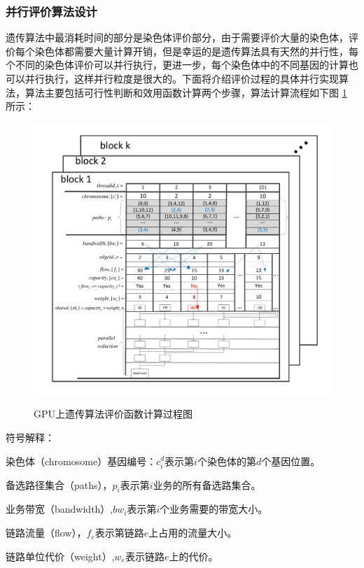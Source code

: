\subsubsection{并行评价算法设计}
遗传算法中最消耗时间的部分是染色体评价部分，由于需要评价大量的染色体，评价每个染色体都需要大量计算开销，但是幸运的是遗传算法具有天然的并行性，每个不同的染色体评价可以并行执行，更进一步，每个染色体中的不同基因的计算也可以并行执行，这样并行粒度是很大的。下面将介绍评价过程的具体并行实现算法，算法主要包括可行性判断和效用函数计算两个步骤，算法计算流程如下图 \ref{fitness} 所示：
\begin{figure}
  \begin{center}
    {\includegraphics[width=1 \textwidth]{figures/GPUfitness.pdf}}
    \end{center}
  \caption{{\footnotesize{GPU上遗传算法评价函数计算过程图}}}
  \label{fitness}
\end{figure}
符号解释：

染色体（chromosome）基因编号：$c^d_i$表示第$i$个染色体的第$d$个基因位置。

备选路径集合（paths），$p_i$表示第$i$业务的所有备选路集合。

业务带宽（bandwidth）,$bw_i$表示第$i$个业务需要的带宽大小。

链路流量（flow），$f_e$表示第链路$e$上占用的流量大小。

链路单位代价（weight）,$w_e$表示链路$e$上的代价。

